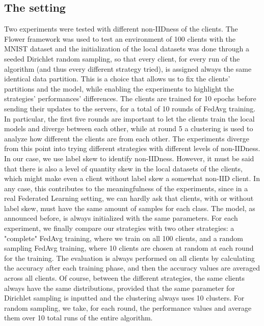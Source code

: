 \documentclass{article}
\begin{document}
\subsection{The setting}
Two experiments were tested with different non-IIDness of the clients. The Flower framework was used to test an environment of 100 clients with the MNIST dataset and the initialization of the local datasets was done through a seeded Dirichlet random sampling, so that every client, for every run of the algorithm (and thus every different strategy tried), is assigned always the same identical data partition. 
This is a choice that allows us to fix the clients' partitions and the model, while enabling the experiments to highlight the strategies' performances' differences.
The clients are trained for 10 epochs before sending their updates to the servers, for a total of 10 rounds of FedAvg training. In particular, the first five rounds are important to let the clients train the local models and diverge between each other, while at round 5 a clustering is used to analyze how different the clients are from each other. The experiments diverge from this point into trying different strategies with different levels of non-IIDness. In our case, we use label skew to identify non-IIDness. However, it must be said that there is also a level of quantity skew in the local datasets of the clients, which might make even a client without label skew a somewhat non-IID client. In any case, this contributes to the meaningfulness of the experiments, since in a real Federated Learning setting, we can hardly ask that clients, with or without label skew, must have the same amount of samples for each class.
The model, as announced before, is always initialized with the same parameters.
For each experiment, we finally compare our strategies with two other strategies: a "complete" FedAvg training, where we train on all 100 clients, and a random sampling  FedAvg training, where 10 clients are chosen at random at each round for the training. The evaluation is always performed on all clients by calculating the accuracy after each training phase, and then the accuracy values are averaged across all clients. Of course, between the different strategies, the same clients always have the same distributions, provided that the same parameter for Dirichlet sampling is inputted and the clustering always uses 10 clusters.
For random sampling, we take, for each round, the performance values and average them over 10 total runs of the entire algorithm.
\end{document}
